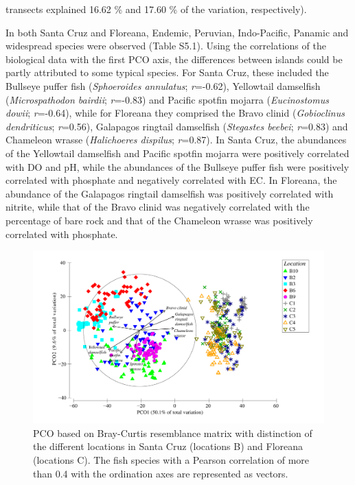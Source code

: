 transects explained 16.62 \% and 17.60 \% of the variation, respectively). 

In both Santa Cruz and Floreana, Endemic, Peruvian, Indo-Pacific, Panamic and widespread species were observed (Table S5.1). Using the correlations of the biological data with the first PCO axis, the differences between islands could be partly attributed to some typical species. For Santa Cruz, these included the Bullseye puffer fish (\textit{Sphoeroides annulatus}; \textit{r}=-0.62), Yellowtail damselfish (\textit{Microspathodon bairdii}; \textit{r}=-0.83) and Pacific spotfin mojarra (\textit{Eucinostomus dowii}; \textit{r}=-0.64), while for Floreana they comprised the Bravo clinid (\textit{Gobioclinus dendriticus}; \textit{r}=0.56), Galapagos ringtail damselfish (\textit{Stegastes beebei}; \textit{r}=0.83) and Chameleon wrasse (\textit{Halichoeres dispilus}; \textit{r}=0.87). In Santa Cruz, the abundances of the Yellowtail damselfish and Pacific spotfin mojarra were positively correlated with DO and pH, while the abundances of the Bullseye puffer fish were positively correlated with phosphate and negatively correlated with EC. In Floreana, the abundance of the Galapagos ringtail damselfish was positively correlated with nitrite, while that of the Bravo clinid was negatively correlated with the percentage of bare rock and that of the Chameleon wrasse was positively correlated with phosphate. 

\begin{figure}[h!]
  \centering\includegraphics[scale=0.42]{PCO_with_species}
  \caption{PCO based on Bray-Curtis resemblance matrix with distinction of the different locations in Santa Cruz (locations B) and Floreana (locations C). The fish species with a Pearson correlation of more than 0.4 with the ordination axes are represented as vectors.} 
  \label{fig:PCO_Location_full}
\end{figure}

